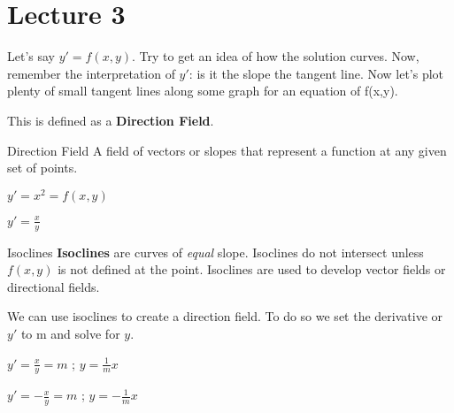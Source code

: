 \section{Lecture 3}
Let's say $y'=f(x,y)$. Try to get an idea of how the solution curves. Now, remember the interpretation of $y'$: is it the slope the tangent line. Now let's plot plenty of small tangent lines along some graph for an equation of f(x,y).


This is defined as a \textbf{Direction Field}.

\begin{definition}{Direction Field}{}
    A field of vectors or slopes that represent a function at any given set of points.
\end{definition}

\begin{example}{$y'=x^2=f(x,y)$}{}
    
\end{example}

\begin{example}{$y'=\frac xy$}{}

\end{example}

\begin{definition}{Isoclines}{}
    \textbf{Isoclines} are curves of \emph{equal} slope. Isoclines do not intersect unless $f(x,y)$ is not defined at the point. Isoclines are used to develop vector fields or directional fields.
\end{definition}

We can use isoclines to create a direction field. To do so we set the derivative or $y'$ to m and solve for $y$.

\begin{example}{$y'=\frac xy=m$ ; $y=\frac 1m x$}{}
    
\end{example}

\begin{example}{$y'=-\frac xy=m$ ; $y=-\frac 1m x$}{}
    
\end{example}